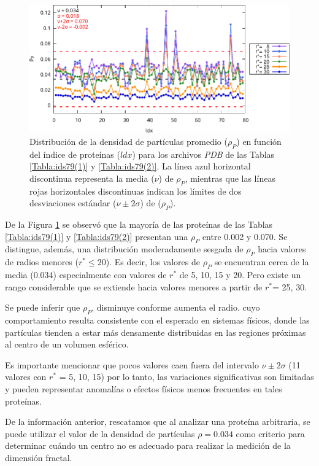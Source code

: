  	\begin{figure}[H]
 		\centering
 		\includegraphics[width=\linewidth]{graphs/ldx-dp.pdf}
 		\caption{Distribución de la densidad de 
 			partículas promedio ($\rho_P$) en función del 
 			\'{i}ndice de prote\'{i}nas ($ldx$) para los 
 			archivos \emph{PDB} de las Tablas 
 			\ref{Tabla:ids79(1)} y \ref{Tabla:ids79(2)}. La línea azul horizontal 
 			discontinua representa la media ($\nu$) de   
 			$\rho_P$, mientras que las líneas rojas horizontales discontinuas indican los límites de dos desviaciones estándar (\(\nu \pm 2\sigma\)) de ($\rho_P$).}
 		\label{index-vs-density}
 	\end{figure}
 	
 	
 	De la Figura \ref{index-vs-density} se observó que la mayor\'{i}a de las prote\'{i}nas de las Tablas \ref{Tabla:ids79(1)} y \ref{Tabla:ids79(2)}  presentan una $\rho_P$ entre 0.002 y 0.070. 
 	Se distingue, además, una distribución moderadamente sesgada de $\rho_P$ hacia valores de radios menores ($r^* \leq 20$). Es decir, los valores de \(\rho_P\) se encuentran cerca de la media (0.034) especialmente con valores de $r^*$ de 5, 10, 15 y 20. Pero existe un rango considerable que se extiende hacia valores menores a partir de $r^*$= 25, 30.
 	
 	
 	Se puede inferir que $\rho_P$, disminuye conforme aumenta el radio. cuyo comportamiento resulta consistente con el esperado en sistemas físicos, donde las partículas tienden a estar más densamente distribuidas en las regiones próximas al centro de un volumen esférico.
 	
 	Es importante mencionar que pocos valores caen fuera del intervalo $\nu \pm 2\sigma$ (11 valores con $r^*$ = 5, 10, 15) por lo tanto, las variaciones significativas son limitadas y pueden representar anomalías o efectos físicos menos frecuentes en tales prote\'{i}nas.
 	
 	De la informaci\'{o}n anterior, rescatamos que al analizar una prote\'{i}na arbitraria, se puede utilizar el valor de la densidad de part\'{i}culas $\rho = 0.034$ como criterio para determinar cu\'{a}ndo un centro no es adecuado para realizar la medici\'{o}n de la dimensi\'{o}n fractal. 
 	
